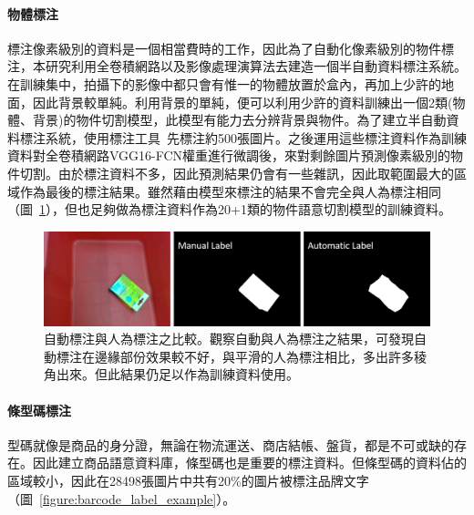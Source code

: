 \paragraph{物體標注}
標注像素級別的資料是一個相當費時的工作，因此為了自動化像素級別的物件標注，本研究利用全卷積網路以及影像處理演算法去建造一個半自動資料標注系統。在訓練集中，拍攝下的影像中都只會有惟一的物體放置於盒內，再加上少許的地面，因此背景較單純。利用背景的單純，便可以利用少許的資料訓練出一個2類(物體、背景)的物件切割模型，此模型有能力去分辨背景與物件。為了建立半自動資料標注系統，使用標注工具~\cite{russell2008labelme}先標注約500張圖片。之後運用這些標注資料作為訓練資料對全卷積網路VGG16-FCN權重進行微調後，來對剩餘圖片預測像素級別的物件切割。由於標注資料不多，因此預測結果仍會有一些雜訊，因此取範圍最大的區域作為最後的標注結果。雖然藉由模型來標注的結果不會完全與人為標注相同（圖~\ref{figure:auto_object_label}），但也足夠做為標注資料作為20+1類的物件語意切割模型的訓練資料。

\begin{figure}[H]
	\centering
	\includegraphics[height=!, width=1.0\linewidth, keepaspectratio=true]
	{./figures/auto_object_label.png}
  \caption{自動標注與人為標注之比較。觀察自動與人為標注之結果，可發現自動標注在邊緣部份效果較不好，與平滑的人為標注相比，多出許多稜角出來。但此結果仍足以作為訓練資料使用。}
  \label{figure:auto_object_label}
\end{figure}

\paragraph{條型碼標注}
型碼就像是商品的身分證，無論在物流運送、商店結帳、盤貨，都是不可或缺的存在。因此建立商品語意資料庫，條型碼也是重要的標注資料。但條型碼的資料佔的區域較小，因此在28498張圖片中共有20\%的圖片被標注品牌文字（圖~\ref{figure:barcode_label_example}）。

